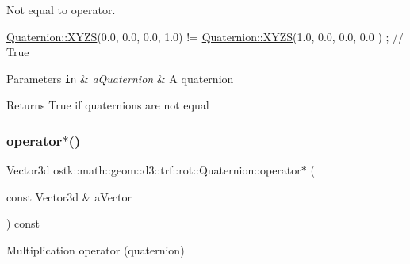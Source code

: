 Not equal to operator. 


\begin{DoxyCode}
\hyperlink{classostk_1_1math_1_1geom_1_1d3_1_1trf_1_1rot_1_1_quaternion_ac57ea57a4033622ed1389101b2e58c76}{Quaternion::XYZS}(0.0, 0.0, 0.0, 1.0) != \hyperlink{classostk_1_1math_1_1geom_1_1d3_1_1trf_1_1rot_1_1_quaternion_ac57ea57a4033622ed1389101b2e58c76}{Quaternion::XYZS}(1.0, 0.0, 0.0, 0.0
      ) ; \textcolor{comment}{// True}
\end{DoxyCode}



\begin{DoxyParams}[1]{Parameters}
\mbox{\tt in}  & {\em a\+Quaternion} & A quaternion \\
\hline
\end{DoxyParams}
\begin{DoxyReturn}{Returns}
True if quaternions are not equal 
\end{DoxyReturn}
\mbox{\label{classostk_1_1math_1_1geom_1_1d3_1_1trf_1_1rot_1_1_quaternion_a26bf54c393d70c812538b119d4cb10a3}} 
\subsubsection{\texorpdfstring{operator$\ast$()}{operator*()}}
{\footnotesize\ttfamily Vector3d ostk\+::math\+::geom\+::d3\+::trf\+::rot\+::\+Quaternion\+::operator$\ast$ (\begin{DoxyParamCaption}\item[{const Vector3d \&}]{a\+Vector }\end{DoxyParamCaption}) const}



Multiplication operator (quaternion) 


